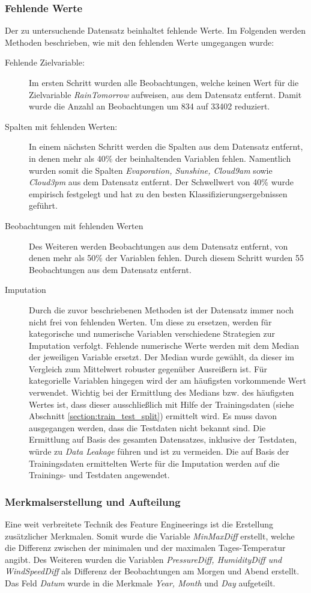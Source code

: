 \subsubsection{Fehlende Werte}
Der zu untersuchende Datensatz beinhaltet fehlende Werte. Im Folgenden werden Methoden beschrieben, wie mit den fehlenden Werte umgegangen wurde:
\begin{description}
	\item[Fehlende Zielvariable:]
	 Im ersten Schritt wurden alle Beobachtungen, welche keinen Wert für die Zielvariable \emph{RainTomorrow} aufweisen, aus dem Datensatz entfernt. Damit wurde die Anzahl an Beobachtungen um 834 auf 33402 reduziert.
	 \item[Spalten mit fehlenden Werten:]
	 In einem nächsten Schritt werden die Spalten aus dem Datensatz entfernt, in denen mehr als 40\% der beinhaltenden Variablen fehlen. Namentlich wurden somit die Spalten \emph{Evaporation, Sunshine, Cloud9am} sowie \emph{Cloud3pm} aus dem Datensatz entfernt. Der Schwellwert von 40\% wurde empirisch festgelegt und hat zu den besten Klassifizierungsergebnissen geführt.
	 \item[Beobachtungen mit fehlenden Werten]
	 Des Weiteren werden Beobachtungen aus dem Datensatz entfernt, von denen mehr als 50\% der Variablen fehlen. Durch diesem Schritt wurden 55 Beobachtungen aus dem Datensatz entfernt.
	 \item[Imputation]
	 Durch die zuvor beschriebenen Methoden ist der Datensatz immer noch  nicht frei von fehlenden Werten. Um diese zu ersetzen, werden für kategorische und numerische Variablen verschiedene Strategien zur Imputation verfolgt. Fehlende numerische Werte werden mit dem Median der jeweiligen Variable ersetzt. Der Median wurde gewählt, da dieser im Vergleich zum Mittelwert robuster gegenüber Ausreißern ist. Für kategorielle Variablen hingegen wird der am häufigsten vorkommende Wert verwendet. Wichtig bei der Ermittlung des Medians bzw. des häufigsten Wertes ist, dass dieser ausschließlich mit Hilfe der Trainingsdaten (siehe Abschnitt \ref{section:train_test_split}) ermittelt wird. Es muss davon ausgegangen werden, dass die Testdaten nicht bekannt sind. Die Ermittlung auf Basis des gesamten Datensatzes, inklusive der Testdaten, würde zu \emph{Data Leakage} führen und ist zu vermeiden. Die auf Basis der Trainingsdaten ermittelten Werte für die Imputation werden auf die Trainings- und Testdaten angewendet.
\end{description}

\subsubsection{Merkmalserstellung und Aufteilung}
Eine weit verbreitete Technik des Feature Engineerings ist die Erstellung zusätzlicher Merkmalen. Somit wurde die Variable \emph{MinMaxDiff} erstellt, welche die Differenz zwischen der minimalen und der maximalen Tages-Temperatur angibt. Des Weiteren wurden die Variablen \emph{PressureDiff, HumidityDiff und WindSpeedDiff} als Differenz der Beobachtungen am Morgen und Abend erstellt. Das Feld \emph{Datum} wurde in die Merkmale \emph{Year, Month} und \emph{Day} aufgeteilt.

